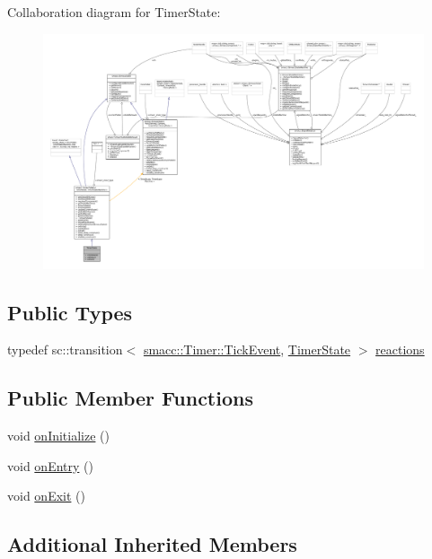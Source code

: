 Collaboration diagram for Timer\+State\+:
\nopagebreak
\begin{figure}[H]
\begin{center}
\leavevmode
\includegraphics[width=350pt]{structTimerState__coll__graph}
\end{center}
\end{figure}
\subsection*{Public Types}
\begin{DoxyCompactItemize}
\item 
typedef sc\+::transition$<$ \hyperlink{classsmacc_1_1Timer_a6f72664250a9ee757619db1605529b98}{smacc\+::\+Timer\+::\+Tick\+Event}, \hyperlink{structTimerState}{Timer\+State} $>$ \hyperlink{structTimerState_a35daa8ac3bab6bcd008aec4dc37b1bcc}{reactions}
\end{DoxyCompactItemize}
\subsection*{Public Member Functions}
\begin{DoxyCompactItemize}
\item 
void \hyperlink{structTimerState_a5d35a1e08f478a4251221854b79ba020}{on\+Initialize} ()
\item 
void \hyperlink{structTimerState_a470dd79996aa36ad5a57da22d749bec8}{on\+Entry} ()
\item 
void \hyperlink{structTimerState_a2a5f76b47bb83d625f00be8b4daadbf6}{on\+Exit} ()
\end{DoxyCompactItemize}
\subsection*{Additional Inherited Members}


